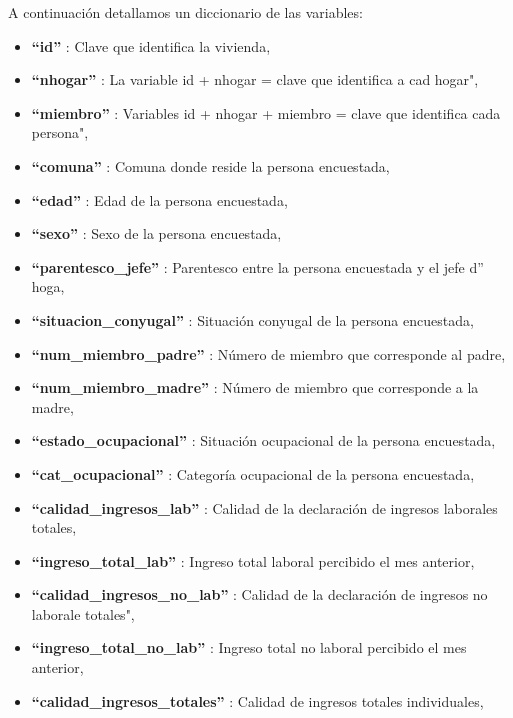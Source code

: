 \documentclass[a4paper]{article}
\begin{document}
    A continuación detallamos un diccionario de las variables:
    \begin{itemize}
        \item \textbf{``id''}                            : Clave que identifica la vivienda,
        \item \textbf{``nhogar''}                        : La variable id + nhogar = clave que identifica a cad hogar",
        \item \textbf{``miembro''}                       : Variables id + nhogar + miembro = clave que identifica  cada persona",
        \item \textbf{``comuna''}                        : Comuna donde reside la persona encuestada,
        \item \textbf{``edad''}                          : Edad de la persona encuestada,
        \item \textbf{``sexo''}                          : Sexo de la persona encuestada,
        \item \textbf{``parentesco\_jefe''}              : Parentesco entre la persona encuestada y el jefe d'' hoga,
        \item \textbf{``situacion\_conyugal''}           : Situación conyugal de la persona encuestada,
        \item \textbf{``num\_miembro\_padre''}           : Número de miembro que corresponde al padre,
        \item \textbf{``num\_miembro\_madre''}           : Número de miembro que corresponde a la madre,
        \item \textbf{``estado\_ocupacional''}           : Situación ocupacional de la persona encuestada,
        \item \textbf{``cat\_ocupacional''}              : Categoría ocupacional de la persona encuestada,
        \item \textbf{``calidad\_ingresos\_lab''}        : Calidad de la declaración de ingresos laborales totales,
        \item \textbf{``ingreso\_total\_lab''}           : Ingreso total laboral percibido el mes anterior,
        \item \textbf{``calidad\_ingresos\_no\_lab''}    : Calidad de la declaración de ingresos no laborale totales",
        \item \textbf{``ingreso\_total\_no\_lab''}       : Ingreso total no laboral percibido el mes anterior,
        \item \textbf{``calidad\_ingresos\_totales''}    : Calidad de ingresos totales individuales,

\end{itemize}
\end{document}
